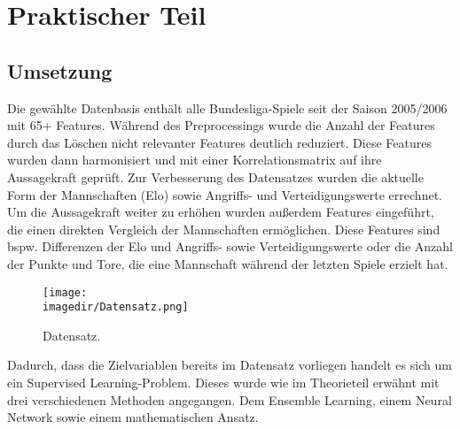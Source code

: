 \chapter{Praktischer Teil}

\section{Umsetzung}

Die gewählte Datenbasis enthält alle Bundesliga-Spiele seit der Saison 2005/2006 mit
65+ Features. Während des Preprocessings wurde die Anzahl der Features durch
das Löschen nicht relevanter Features deutlich reduziert. Diese Features wurden dann
harmonisiert und mit einer Korrelationsmatrix auf ihre Aussagekraft geprüft.
Zur Verbesserung des Datensatzes wurden die aktuelle Form der Mannschaften (Elo) sowie Angriffs- und Verteidigungswerte errechnet. Um die Aussagekraft weiter zu erhöhen wurden außerdem Features eingeführt, die einen direkten Vergleich der Mannschaften ermöglichen.
Diese Features sind bspw. Differenzen der Elo und Angriffs- sowie Verteidigungswerte
oder die Anzahl der Punkte und Tore, die eine Mannschaft während der letzten Spiele erzielt hat.

\begin{figure}[H]
	
	\centering
	\texttt{[image: \\imagedir/Datensatz.png]}
	\captionsetup{format=hang}
	\caption[Datensatz]{\label{fig:test}Datensatz.}
	
\end{figure}

Dadurch, dass die Zielvariablen bereits im Datensatz  vorliegen
handelt es sich um ein Supervised Learning-Problem. Dieses wurde
wie im Theorieteil erwähnt mit drei verschiedenen Methoden angegangen.
Dem Ensemble Learning, einem Neural Network sowie einem mathematischen Ansatz.

